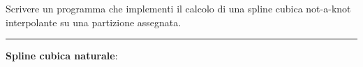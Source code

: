 Scrivere un programma che implementi il calcolo di una spline cubica not-a-knot interpolante su una partizione assegnata.

\hspace{1cm}
\par\noindent\rule{\textwidth}{0.4pt}
\hspace{1cm}

\textbf{Spline cubica naturale}:

